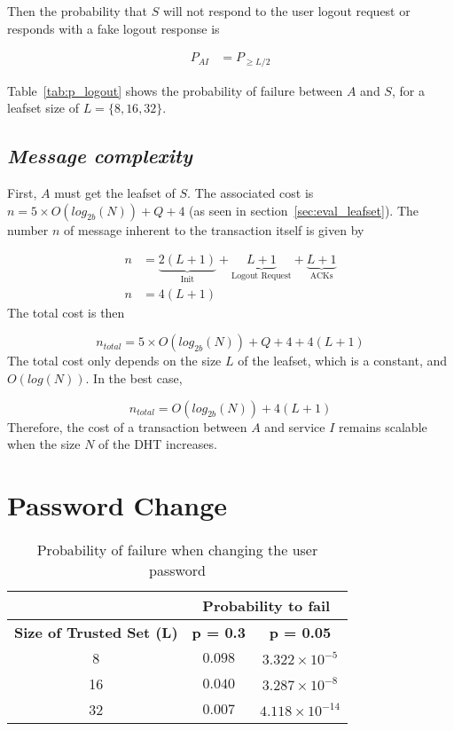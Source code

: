     Then the probability that $S$ will not respond to the user logout 
request or responds with a fake logout response is

    \begin{align}
      P_{AI} &= P_{\ge L/2} 
    \end{align}


    Table~\eqref{tab:p_logout} shows the probability of failure
between $A$ and $S$, for a leafset size of $L = \{8,16,32\}$.

    
  \subsection{\textit{Message complexity}}
    First, $A$ must get the leafset of $S$. The associated cost is $n = 5
\times O(log_{2b}(N)) + Q + 4$ (as seen in section~\ref{sec:eval_leafset}).
    The number $n$ of message inherent to the transaction itself is given by

    \begin{align}
      n &= \underbrace{2(L+1)}_\text{Init} +  \underbrace{L+1}_\text{Logout Request} + \underbrace{L+1}_\text{ACKs}\\
      n &= 4(L+1)
    \end{align}
     The total cost is then

    $$
      n_{total} = 5 \times O(log_{2b}(N)) + Q + 4 + 4(L+1)
    $$    
    The total cost only depends on the size $L$ of the leafset, which is a
constant, and $O(log(N))$. In the best case, 

    $$
      n_{total} = O(log_{2b}(N)) + 4(L+1)
    $$
    Therefore, the cost of a transaction between $A$ and service $I$ remains
scalable when the size $N$ of the DHT increases.

\section{Password Change}
  \label{sec:eval_password_change}
  \begin{table}
    \centering
    \footnotesize
    \begin{tabular}{|c|c|c|}
      \cline{2-3}
      \multicolumn{1}{c|}{}&  \multicolumn{2}{c|}{\textbf{Probability to fail}} \\ \cline{2-3}
      \hline
      \textbf{Size of Trusted Set (L)} & \textbf{p = 0.3} & \textbf{p = 0.05} \\
      \hline \hline
      8 &  $0.098$ & $3.322 \times 10^{-5}$ \\
      \hline
      16 & $0.040$ & $3.287 \times 10^{-8}$  \\
      \hline
      32 & $0.007$ & $4.118 \times 10^{-14}$  \\
      \hline
    \end{tabular}
    \caption{Probability of failure when changing the user password}
    \label{tab:p_password_change}
  \end{table}
  

